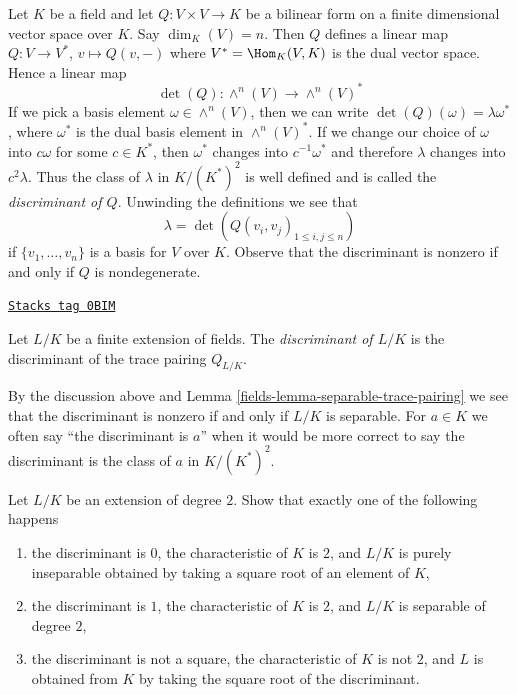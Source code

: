 Let $K$ be a field and let $Q : V \times V \to K$ be a bilinear form
on a finite dimensional vector space over $K$. Say $\dim_K(V) = n$.
Then $Q$ defines a linear map $Q : V \to V^*$, $v \mapsto Q(v, -)$
where $V^* = \Hom_K(V, K)$ is the dual vector space. Hence a linear map
$$
\det(Q) : \wedge^n(V) \longrightarrow \wedge^n(V)^*
$$
If we pick a basis element $\omega \in \wedge^n(V)$, then we can
write $\det(Q)(\omega) = \lambda \omega^*$, where $\omega^*$
is the dual basis element in $\wedge^n(V)^*$. If we change our
choice of $\omega$ into $c \omega$ for some $c \in K^*$, then
$\omega^*$ changes into $c^{-1} \omega^*$ and therefore
$\lambda$ changes into $c^2 \lambda$. Thus the class of
$\lambda$ in $K/(K^*)^2$ is well defined and is called the
{\it discriminant of $Q$}. Unwinding the definitions we see that
$$
\lambda = \det(Q(v_i, v_j)_{1 \leq i, j \leq n})
$$
if $\{v_1, \ldots, v_n\}$ is a basis for $V$ over $K$. Observe that
the discriminant is nonzero if and only if $Q$ is nondegenerate.

\begin{definition}[Discriminant]
\label{fields-definition-discriminant}
\href{https://stacks.math.columbia.edu/tag/0BIM}{\texttt{Stacks tag 0BIM}}

Let $L/K$ be a finite extension of fields. The
{\it discriminant of $L/K$} is the discriminant of
the trace pairing $Q_{L/K}$.
\end{definition}

By the discussion above and Lemma \ref{fields-lemma-separable-trace-pairing}
we see that the discriminant is nonzero if and only
if $L/K$ is separable. For $a \in K$ we often say
``the discriminant is $a$'' when it would be more correct
to say the discriminant is the class of $a$ in $K/(K^*)^2$.

\begin{exercise}
\label{exercise-quadratic-discriminant}
Let $L/K$ be an extension of degree $2$. Show that exactly
one of the following happens
\begin{enumerate}
\item the discriminant is $0$, the characteristic of $K$ is $2$,
and $L/K$ is purely inseparable obtained by taking a square root
of an element of $K$,
\item the discriminant is $1$, the characteristic of $K$ is $2$, and
$L/K$ is separable of degree $2$,
\item the discriminant is not a square, the characteristic of $K$
is not $2$, and $L$ is obtained from $K$ by taking the square root
of the discriminant.
\end{enumerate}
\end{exercise}

